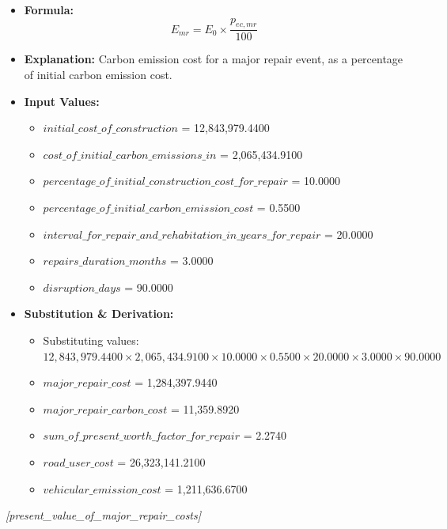 \documentclass[12pt,a4paper]{article}
\begin{document}
\begin{itemize}
  \item \textbf{Formula:} $$E_{mr} = E_0 \times \frac{p_{ec,mr}}{100}$$
  \item \textbf{Explanation:} Carbon emission cost for a major repair event, as a percentage of initial carbon emission cost.
  \item \textbf{Input Values:}
  \begin{itemize}
    \item $initial\_cost\_of\_construction$ = 12,843,979.4400
    \item $cost\_of\_initial\_carbon\_emissions\_in$ = 2,065,434.9100
    \item $percentage\_of\_initial\_construction\_cost\_for\_repair$ = 10.0000
    \item $percentage\_of\_initial\_carbon\_emission\_cost$ = 0.5500
    \item $interval\_for\_repair\_and\_rehabitation\_in\_years\_for\_repair$ = 20.0000
    \item $repairs\_duration\_months$ = 3.0000
    \item $disruption\_days$ = 90.0000
  \end{itemize}
  \item \textbf{Substitution \& Derivation:}
  \begin{itemize}
    \item Substituting values: $12,843,979.4400 \times 2,065,434.9100 \times 10.0000 \times 0.5500 \times 20.0000 \times 3.0000 \times 90.0000$
    \item $major\_repair\_cost$ = 1,284,397.9440
    \item $major\_repair\_carbon\_cost$ = 11,359.8920
    \item $sum\_of\_present\_worth\_factor\_for\_repair$ = 2.2740
    \item $road\_user\_cost$ = 26,323,141.2100
    \item $vehicular\_emission\_cost$ = 1,211,636.6700
  \end{itemize}
\end{itemize}


\textit{[present\_value\_of\_major\_repair\_costs]}
\end{document}
